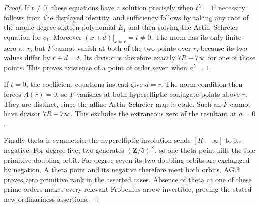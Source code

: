\begin{proof}
If $t\ne0$, these equations have a solution precisely
when $t^5=1$: necessity follows from the displayed
identity, and sufficiency follows by taking any root of
the monic degree-sixteen polynomial $E_1$ and then solving
the Artin--Schreier equation for $c_1$. Moreover
$(x+d)|_{x=r}=t\ne0$. The norm has its only finite zero
at $r$, but $F$ cannot vanish at both of the two points
over $r$, because its two values differ by $r+d=t$.
Its divisor is therefore exactly $7R-7\infty$ for one
of those points. This proves existence of a point of
order seven when $a^5=1$.

If $t=0$, the coefficient equations instead give $d=r$.
The norm condition then forces $A(r)=0$, so $F$ vanishes
at both hyperelliptic conjugate points above $r$. They
are distinct, since the affine Artin--Schreier map is
etale. Such an $F$ cannot have divisor $7R-7\infty$.
This excludes the extraneous zero of the resultant at $a=0$.

Finally theta is symmetric: the hyperelliptic involution
sends $[R-\infty]$ to its negative. For degree five,
two generates $(\mathbf Z/5)^\times$, so one theta point
kills the sole primitive doubling orbit. For degree
seven its two doubling orbits are exchanged by negation.
A theta point and its negative therefore meet both
orbits. AG.3 proves zero primitive rank in the asserted
cases. Absence of theta at one of these prime orders
makes every relevant Frobenius arrow invertible, proving
the stated new-ordinariness assertions.
\end{proof}

